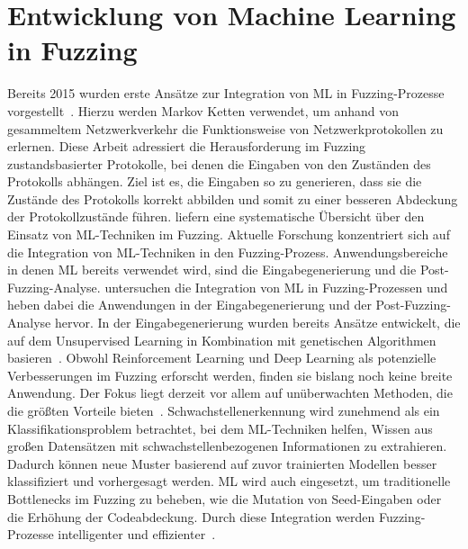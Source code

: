 
\section{Entwicklung von Machine Learning in Fuzzing}\label{sec:machine-learning-in-fuzzing}
Bereits 2015 wurden erste Ansätze zur Integration von ML in Fuzzing-Prozesse vorgestellt~\cite{thuraisingham_pulsar_2015}.
Hierzu werden Markov Ketten verwendet, um anhand von gesammeltem Netzwerkverkehr die Funktionsweise von Netzwerkprotokollen zu
erlernen.
Diese Arbeit adressiert die Herausforderung im Fuzzing zustandsbasierter Protokolle, bei denen die Eingaben von den
Zuständen des Protokolls abhängen.
Ziel ist es, die Eingaben so zu generieren, dass sie die Zustände des Protokolls korrekt abbilden und somit zu einer
besseren Abdeckung der Protokollzustände führen.\newline
\citet{wang_systematic_2020} liefern eine systematische Übersicht über den Einsatz von ML-Techniken im Fuzzing.
Aktuelle Forschung konzentriert sich auf die Integration von ML-Techniken in den Fuzzing-Prozess.
Anwendungsbereiche in denen ML bereits verwendet wird, sind die Eingabegenerierung und die Post-Fuzzing-Analyse.\newline
\citet{saavedra_review_2019} untersuchen die Integration von ML in Fuzzing-Prozessen und heben dabei die Anwendungen in der
Eingabegenerierung und der Post-Fuzzing-Analyse hervor.
In der Eingabegenerierung wurden bereits Ansätze entwickelt, die auf dem Unsupervised Learning in Kombination mit
genetischen Algorithmen basieren~\cite{saavedra_review_2019}.
Obwohl Reinforcement Learning und Deep Learning als potenzielle Verbesserungen im Fuzzing erforscht werden, finden sie
bislang noch keine breite Anwendung.
Der Fokus liegt derzeit vor allem auf unüberwachten Methoden, die die größten Vorteile bieten~\cite{saavedra_review_2019}.
Schwachstellenerkennung wird zunehmend als ein Klassifikationsproblem betrachtet, bei dem ML-Techniken helfen, Wissen aus
großen Datensätzen mit schwachstellenbezogenen Informationen zu extrahieren.
Dadurch können neue Muster basierend auf zuvor trainierten Modellen besser klassifiziert und vorhergesagt werden\cite{wang_systematic_2020}.\newline
ML wird auch eingesetzt, um traditionelle Bottlenecks im Fuzzing zu beheben, wie die Mutation von Seed-Eingaben oder die Erhöhung
der Codeabdeckung.
Durch diese Integration werden Fuzzing-Prozesse intelligenter und effizienter~\cite{wang_systematic_2020}.\newline
